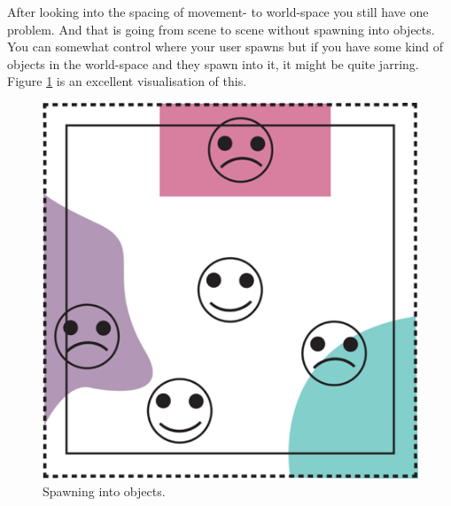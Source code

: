 \documentclass{report}
\begin{document}
				After looking into the spacing of movement- to world-space you still have one problem. And that is going from scene to scene without spawning into objects. You can somewhat control where your user spawns but if you have some kind of objects in the world-space and they spawn into it, it might be quite jarring. Figure \ref{fig:area_object} is an excellent visualisation of this. 
				
				\begin{figure}[h!]
					\centering
					\includegraphics[width=\linewidth/2]{img/area_in_object.png}
					\caption{Spawning into objects.} 
					\label{fig:area_object}
				\end{figure}
				
\end{document}
